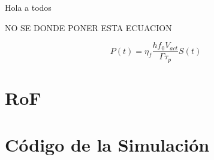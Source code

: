 Hola a todos

NO SE DONDE PONER ESTA ECUACION

	\begin{equation}
		P(t) = \eta_f \frac{h f_0 V_{act}}{\Gamma \tau_p} S(t)
		\label{eq:Power}
	\end{equation}
	

	\section{RoF}
		\label{Mdl:RoF}
	

	\section{Código de la Simulación}
		\label{Mdl:Code}
	
		
	
